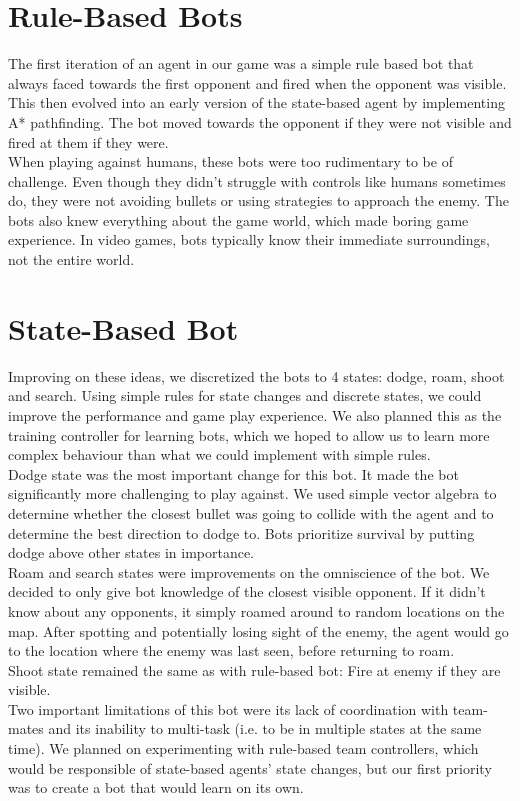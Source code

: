 \documentclass{article}
\begin{document}
	
	\section{Rule-Based Bots}
	
	The first iteration of an agent in our game was a simple rule based bot that always faced towards the first opponent and fired when the opponent was visible. This then evolved into an early version of the state-based agent by implementing A* pathfinding. The bot moved towards the opponent if they were not visible and fired at them if they were. \\
	When playing against humans, these bots were too rudimentary to be of challenge. Even though they didn't struggle with controls like humans sometimes do, they were not avoiding bullets or using strategies to approach the enemy. The bots also knew everything about the game world, which made boring game experience. In video games, bots typically know their immediate surroundings, not the entire world.
	
	\section{State-Based Bot}
	Improving on these ideas, we discretized the bots to 4 states: dodge, roam, shoot and search. Using simple rules for state changes and discrete states, we could improve the performance and game play experience. We also planned this as the training controller for learning bots, which we hoped to allow us to learn more complex behaviour than what we could implement with simple rules. \\
	Dodge state was the most important change for this bot. It made the bot significantly more challenging to play against. We used simple vector algebra to determine whether the closest bullet was going to collide with the agent and to determine the best direction to dodge to. Bots prioritize survival by putting dodge above other states in importance. \\
	Roam and search states were improvements on the omniscience of the bot. We decided to only give bot knowledge of the closest visible opponent. If it didn't know about any opponents, it simply roamed around to random locations on the map. After spotting and potentially losing sight of the enemy, the agent would go to the location where the enemy was last seen, before returning to roam. \\
	Shoot state remained the same as with rule-based bot: Fire at enemy if they are visible. \\
	Two important limitations of this bot were its lack of coordination with team-mates and its inability to multi-task (i.e. to be in multiple states at the same time). We planned on experimenting with rule-based team controllers,  which would be responsible of state-based agents' state changes, but our first priority was to create a bot that would learn on its own.
	
\end{document}
